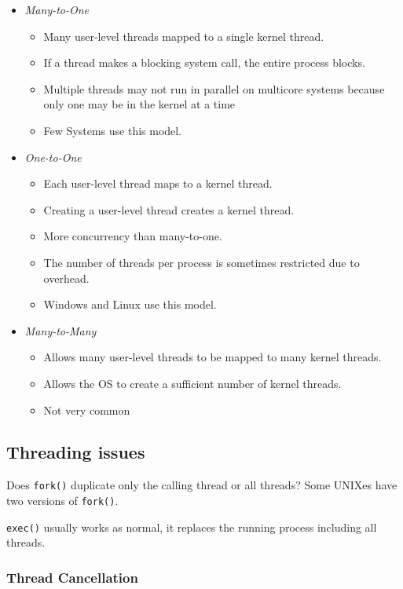 \documentclass[]{article}
\begin{document}
\begin{itemize}
    \item \emph{Many-to-One}
    \begin{itemize}
        \item Many user-level threads mapped to a single kernel thread.
        \item If a thread makes a blocking system call, the entire process blocks.
        \item Multiple threads may not run in parallel on multicore systems because only one may be in the kernel at a time
        \item Few Systems use this model.
    \end{itemize}
    \item \emph{One-to-One}
    \begin{itemize}
        \item Each user-level thread maps to a kernel thread.
        \item Creating a user-level thread creates a kernel thread.
        \item More concurrency than many-to-one.
        \item The number of threads per process is sometimes restricted due to overhead.
        \item Windows and Linux use this model.
    \end{itemize}
    \item \emph{Many-to-Many}
    \begin{itemize}
        \item Allows many user-level threads to be mapped to many kernel threads.
        \item Allows the OS to create a sufficient number of kernel threads.
        \item Not very common
    \end{itemize}
\end{itemize}

\subsection{Threading issues}

Does \verb|fork()| duplicate only the calling thread or all threads? Some UNIXes have two versions of \verb|fork()|.

\verb|exec()| usually works as normal, it replaces the running process including all threads.

\subsubsection*{Thread Cancellation}
\end{document}
